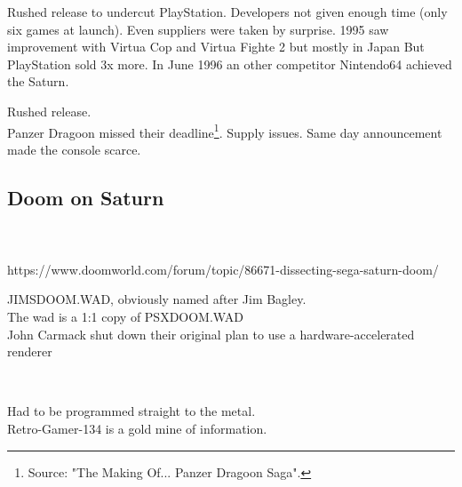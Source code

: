 \par
Rushed release to undercut PlayStation. Developers not given enough time (only six games at launch). Even suppliers were taken by surprise. 1995 saw improvement with Virtua Cop and Virtua Fighte 2 but mostly in Japan  But PlayStation sold 3x more. In June 1996 an other competitor Nintendo64 achieved the Saturn.
\par
Rushed release.\\
Panzer Dragoon missed their deadline\footnote{Source: "The Making Of... Panzer Dragoon Saga".}.
Supply issues. Same day announcement made the console scarce.











\subsection{Doom on Saturn}
\\
\\
https://www.doomworld.com/forum/topic/86671-dissecting-sega-saturn-doom/\\
\par
JIMSDOOM.WAD, obviously named after Jim Bagley.\\
The wad is a 1:1 copy of PSXDOOM.WAD\\
John Carmack shut down their original plan to use a hardware-accelerated renderer\\
\par

\\
\par


Had to be programmed straight to the metal.\\
Retro-Gamer-134 is a gold mine of information.\\

